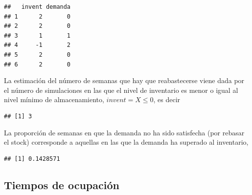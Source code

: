 \documentclass[
]{book}
\newenvironment{Shaded}{\begin{snugshade}}{\end{snugshade}}
\newcommand{\FunctionTok}[1]{\textcolor[rgb]{0.00,0.00,0.00}{#1}}
\newcommand{\NormalTok}[1]{#1}
\newcommand{\SpecialCharTok}[1]{\textcolor[rgb]{0.00,0.00,0.00}{#1}}
\theoremstyle{definition}
\theoremstyle{definition}
\theoremstyle{definition}
\theoremstyle{definition}
\theoremstyle{remark}
\begin{document}
\begin{verbatim}
##   invent demanda
## 1      2       0
## 2      2       0
## 3      1       1
## 4     -1       2
## 5      2       0
## 6      2       0
\end{verbatim}

La estimación del número de semanas que hay que reabastecerse viene dada por el número de simulaciones en las que el nivel de inventario es menor o igual al nivel mínimo de almacenamiento, \(invent=X\leq 0\), es decir

\begin{Shaded}
\end{Shaded}

\begin{verbatim}
## [1] 3
\end{verbatim}

La proporción de semanas en que la demanda no ha sido satisfecha (por rebasar el stock) corresponde a aquellas en las que la demanda ha superado al inventario,

\begin{Shaded}
\end{Shaded}

\begin{verbatim}
## [1] 0.1428571
\end{verbatim}

\hypertarget{tiemposocupa-sec}{%
\subsection{Tiempos de ocupación}\label{tiemposocupa-sec}}
\end{document}
